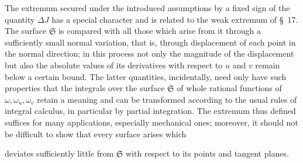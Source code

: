 \documentclass[11pt,a4paper,leqno]{article}
\begin{document}
The extremum secured under the introduced assumptions by a fixed sign of the
quantity $\Delta J$ has a special character and is related to the weak
extremum of \S~17. The surface $\mathfrak{S}$ is compared with all those
which arise from it through a sufficiently small normal variation, that is,
through displacement of each point in the normal direction; in this process
not only the magnitude of the displacement but also the absolute values of
its derivatives with respect to $u$ and $v$ remain below a certain bound.
The latter quantities, incidentally, need only have such properties that the
integrals over the surface $\mathfrak{S}$ of whole rational functions of
$\omega,\omega_u,\omega_v$ retain a meaning and can be transformed according
to the usual rules of integral calculus, in particular by partial
integration. The extremum thus defined suffices for many applications,
especially mechanical ones; moreover, it should not be difficult to show
that every surface arises which

deviates sufficiently little from $\mathfrak{S}$ with respect to its points
and tangent planes.
\end{document}
